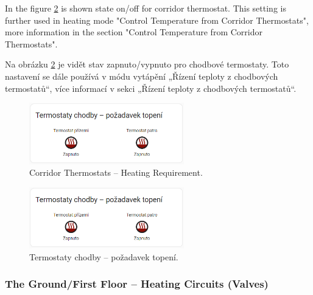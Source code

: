 \begin{English}
In the figure \ref{fig:corridor-thermostats2} is shown state on/off for corridor thermostat. This setting is further used in heating mode "Control Temperature from Corridor Thermostats", more information in the section "Control Temperature from Corridor Thermostats".
\end{English}

\begin{Czech}
Na obrázku \ref{fig:corridor-thermostats2} je vidět stav zapnuto/vypnuto pro chodbové termostaty. Toto nastavení se dále používá v módu vytápění „Řízení teploty z chodbových termostatů“, více informací v sekci „Řízení teploty z chodbových termostatů“.
\end{Czech}


\begin{English}
\begin{figure}[H]
    \centering
    \includegraphics[width=0.6\textwidth]{pictures/czech/software/corridor-thermostats.png}
    \caption{Corridor Thermostats – Heating Requirement.}
    \label{fig:corridor-thermostats2}
\end{figure}
\end{English}

\begin{Czech}
\begin{figure}[H]
    \centering
    \includegraphics[width=0.6\textwidth]{pictures/czech/software/corridor-thermostats.png}
    \caption{Termostaty chodby – požadavek topení.}
    \label{fig:corridor-thermostats2}
\end{figure}
\end{Czech}


\begin{English}
\subsubsection{The Ground/First Floor – Heating Circuits (Valves)}
\end{English}

